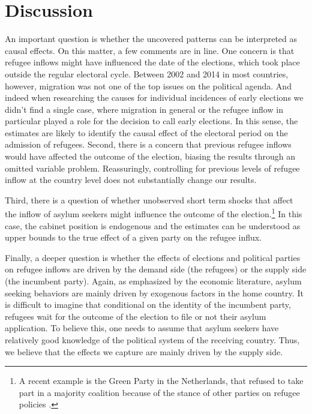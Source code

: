 \documentclass[a4paper,12pt]{article}
\begin{document}
\section{Discussion}\label{sec:discussion}
An important question is whether the uncovered patterns can be interpreted as causal effects. On this matter, a few comments are in line. One concern is that refugee inflows might have influenced the date of the elections, which took place outside the regular electoral cycle. Between 2002 and 2014 in most countries, however, migration was not one of the top issues on the political agenda. And indeed when researching the causes for individual incidences of early elections we didn't find a single case, where migration in general or the refugee inflow in particular played a role for the decision to call early elections. In this sense, the estimates are likely to identify the causal effect of the electoral period on the admission of refugees. Second, there is a concern that previous refugee inflows would have affected the outcome of the election, biasing the results through an omitted variable problem. Reassuringly, controlling for previous levels of refugee inflow at the country level does not substantially change our results.

Third, there is a question of whether unobserved short term shocks that affect the inflow of asylum seekers might influence the outcome of the election.\footnote{A recent example is the Green Party in the Netherlands, that refused to take part in a majority coalition because of the stance of other parties on refugee policies \textit{\citep{Economist2017}}.} In this case, the cabinet position is endogenous and the estimates can be understood as upper bounds to the true effect of a given party on the refugee influx. 

Finally, a deeper question is whether the effects of elections and political parties on refugee inflows are driven by the demand side (the refugees) or the supply side (the incumbent party). Again, as emphasized by the economic literature, asylum seeking behaviors are mainly driven by exogenous factors in the home country. It is difficult to imagine that conditional on the identity of the incumbent party, refugees wait for the outcome of the election to file or not their asylum application. To believe this, one needs to assume that asylum seekers have relatively good knowledge of the political system of the receiving country. Thus, we believe that the effects we capture are mainly driven by the supply side. 
\end{document}

